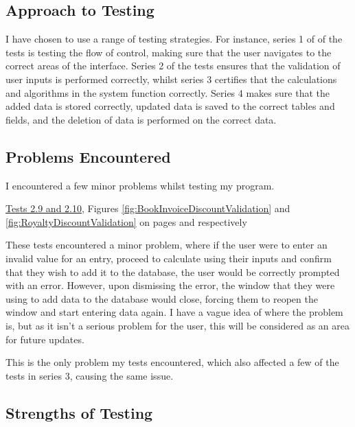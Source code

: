 \subsection{Approach to Testing}

I have chosen to use a range of testing strategies. For instance, series 1 of of the tests is testing the flow of control, making sure that the user navigates to the correct areas of the interface. Series 2 of the tests ensures that the validation of user inputs is performed correctly, whilst series 3 certifies that the calculations and algorithms in the system function correctly. Series 4 makes sure that the added data is stored correctly, updated data is saved to the correct tables and fields, and the deletion of data is performed on the correct data. 

\subsection{Problems Encountered}

I encountered a few minor problems whilst testing my program.

\underline{Tests 2.9 and 2.10}, Figures \ref{fig:BookInvoiceDiscountValidation} and \ref{fig:RoyaltyDiscountValidation} on pages \pageref{fig:BookInvoiceDiscountValidation} and \pageref{fig:RoyaltyDiscountValidation} respectively

These tests encountered a minor problem, where if the user were to enter an invalid value for an entry, proceed to calculate using their inputs and confirm that they wish to add it to the database, the user would be correctly prompted with an error. However, upon dismissing the error, the window that they were using to add data to the database would close, forcing them to reopen the window and start entering data again. I have a vague idea of where the problem is,  but as it isn't a serious problem for the user, this will be considered as an area for future updates. 

This is the only problem my tests encountered, which also affected a few of the tests in series 3, causing the same issue.


\subsection{Strengths of Testing}


